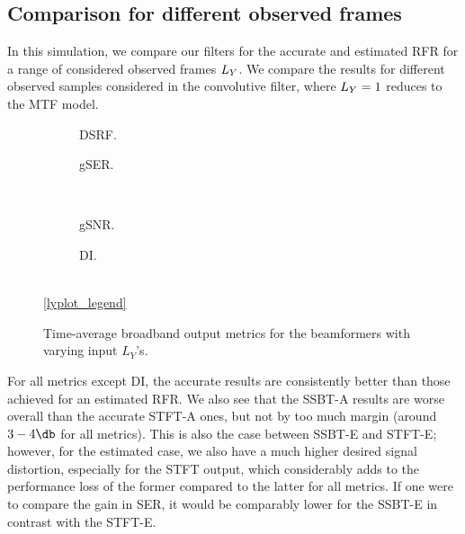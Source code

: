 \subsection{Comparison for different observed frames}

In this simulation, we compare our filters for the accurate and estimated RFR for a range of considered observed frames $\Ly$. We compare the results for different observed samples considered in the convolutive filter, where $\Ly = 1$ reduces to the MTF model.

\begin{figure}[t]
	\centering
	\begin{subfigure}{0.49\textwidth}
		\centering
		
		\caption{DSRF.}
		\label{subfig:lineplot__DSRF__iSER_n15__Ly_var}
	\end{subfigure}\hfill
	\begin{subfigure}{0.49\textwidth}
		\centering
		
		\caption{gSER.}
		\label{subfig:lineplot__gSER__iSER_n15__Ly_var}
	\end{subfigure}\\[1em]
	\begin{subfigure}{0.49\textwidth}
		\centering
		
		\caption{gSNR.}
		\label{subfig:lineplot__gSNR__iSER_n15__Ly_var}
	\end{subfigure}\hfill
	\begin{subfigure}{0.49\textwidth}
		\centering
		
		\caption{DI.}
		\label{subfig:lineplot__DI__iSER_n15__Ly_var}
	\end{subfigure}\\[1em]
	\ref*{lyplot_legend}
	\caption{Time-average broadband output metrics for the beamformers with varying input $L_Y$'s.}
	\label{fig:lineplot__iSER_n15__Ly_var}
\end{figure}

For all metrics except DI, the accurate results are consistently better than those achieved for an estimated RFR. We also see that the SSBT-A results are worse overall than the accurate STFT-A ones, but not by too much margin (around $3-4\dB$ for all metrics). This is also the case between SSBT-E and STFT-E; however, for the estimated case, we also have a much higher desired signal distortion, especially for the STFT output, which considerably adds to the performance loss of the former compared to the latter for all metrics. If one were to compare the gain in SER, it would be comparably lower for the SSBT-E in contrast with the STFT-E.

